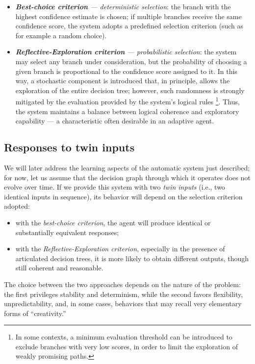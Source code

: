 \documentclass[12pt,a4paper]{article}
\begin{document}
\begin{itemize}
    \item \textit{\textbf{Best-choice criterion} — deterministic selection}: the branch with the highest confidence estimate is chosen; if multiple branches receive the same confidence score, the system adopts a predefined selection criterion (such as for example a random choice).
    
    \item \textit{\textbf{Reflective-Exploration criterion} — probabilistic selection}: the system may select any branch under consideration, but the probability of choosing a given branch is proportional to the confidence score assigned to it.  
    In this way, a stochastic component is introduced that, in principle, allows the exploration of the entire decision tree; however, such randomness is strongly mitigated by the evaluation provided by the system’s logical rules \footnote{In some contexts, a minimum evaluation threshold can be introduced to exclude branches with very low scores, in order to limit the exploration of weakly promising paths.}.  
    Thus, the system maintains a balance between logical coherence and exploratory capability — a characteristic often desirable in an adaptive agent.
\end{itemize}

\subsection{Responses to twin inputs}
We will later address the learning aspects of the automatic system just described; for now, let us assume that the decision graph through which it operates does not evolve over time.  
If we provide this system with two \textit{twin inputs} (i.e., two identical inputs in sequence), its behavior will depend on the selection criterion adopted:
\begin{itemize}
\item with the \textit{best-choice criterion}, the agent will produce identical or substantially equivalent responses;
\item with the \textit{Reflective-Exploration criterion}, especially in the presence of articulated decision trees, it is more likely to obtain different outputs, though still coherent and reasonable.
\end{itemize}
The choice between the two approaches depends on the nature of the problem: the first privileges stability and determinism, while the second favors flexibility, unpredictability, and, in some cases, behaviors that may recall very elementary forms of “creativity.”
\end{document}
